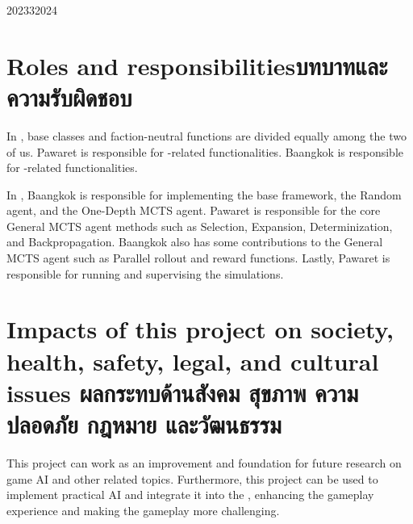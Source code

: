 \begin{plan}{6}{2023}{3}{2024}
\end{plan}

\section{\ifenglish Roles and responsibilities\else บทบาทและความรับผิดชอบ\fi}
In \RootOurs{}, base classes and faction-neutral functions are divided equally among the two of us. Pawaret is responsible for \Marquise{}-related functionalities. Baangkok is responsible for \Eyrie{}-related functionalities.

In \RootAI, Baangkok is responsible for implementing the base framework, the Random agent, and the One-Depth MCTS agent. Pawaret is responsible for the core General MCTS agent methods such as Selection, Expansion, Determinization, and Backpropagation. Baangkok also has some contributions to the General MCTS agent such as Parallel rollout and reward functions. Lastly, Pawaret is responsible for running and supervising the simulations.



\section{\ifenglish%
Impacts of this project on society, health, safety, legal, and cultural issues
\else%
ผลกระทบด้านสังคม สุขภาพ ความปลอดภัย กฎหมาย และวัฒนธรรม
\fi}
This project can work as an improvement and foundation for future research on game AI and other related topics. Furthermore, this project can be used to implement practical AI and integrate it into the \RootV, enhancing the gameplay experience and making the gameplay more challenging.
